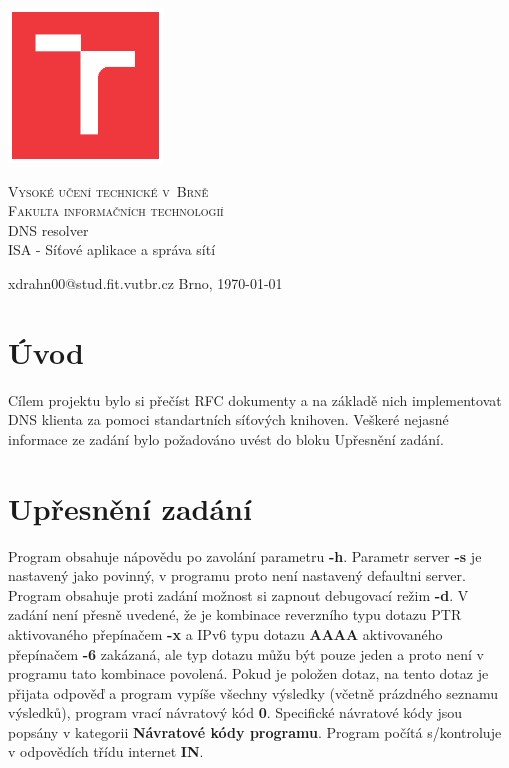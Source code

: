 \documentclass[a4paper,11pt]{article}
\begin{document}
\begin{titlepage}

	\begin{center}

        \includegraphics[width=4.1cm,keepaspectratio,trim={1.2cm 1.2cm 1.2cm 1.2cm},clip]{./template-fig/VUT_symbol_barevne_CMYK_CZ}%

		{\Huge\textsc{Vysoké učení technické v~Brně}}\\
		\medskip
		{\huge\textsc{Fakulta informačních technologií}}\\
		{\huge DNS resolver}\\
		\medskip
		{\LARGE ISA - Síťové aplikace a správa sítí}\\
	\end{center}

    \noindent xdrahn00@stud.fit.vutbr.cz \Large {\hfill Brno, \today}

\end{titlepage}

\section{Úvod}

Cílem projektu bylo si přečíst RFC \cite{rfc10135}\cite{rfc13596} dokumenty a na základě nich implementovat DNS klienta za pomoci standartních síťových knihoven. Veškeré nejasné informace ze zadání bylo požadováno uvést do bloku Upřesnění zadání.

\section{Upřesnění zadání}

Program obsahuje nápovědu po zavolání parametru \textbf{-h}. Parametr server \textbf{-s} je nastavený jako povinný, v programu proto není nastavený defaultni server. Program obsahuje proti zadání možnost si zapnout debugovací režim \textbf{-d}. V zadání není přesně uvedené, že je kombinace reverzního typu dotazu PTR aktivovaného přepínačem \textbf{-x} a IPv6 typu dotazu \textbf{AAAA} aktivovaného přepínačem \textbf{-6} zakázaná, ale typ dotazu můžu být pouze jeden a proto není v programu tato kombinace povolená. Pokud je položen dotaz, na tento dotaz je přijata odpověď a program vypíše všechny výsledky (včetně prázdného seznamu výsledků), program vrací návratový kód \textbf{0}. Specifické návratové kódy jsou popsány v kategorii \textbf{Návratové kódy programu}. Program počítá s/kontroluje v odpovědích třídu internet \textbf{IN}.
\end{document}

